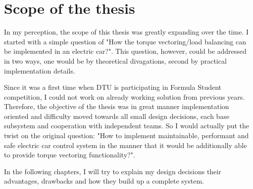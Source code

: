 






\section{Scope of the thesis}
In my perception, the scope of this thesis was greatly expanding over the time. I started with a simple question of "How the torque vectoring/load balancing can be implemented in an electric car?". This question, however, could be addressed in two ways, one would be by theoretical divagations, second by practical implementation details.

Since it was a first time when DTU is participating in Formula Student competition, I could not work on already working solution from previous years.
Therefore, the objective of the thesis was in great manner implementation oriented and difficulty moved towards all small design decisions, each base subsystem and cooperation with independent teams. So I would actually put the twist on the original question: "How to implement maintainable, performant and safe electric car control system in the manner that it would be additionally able to provide torque vectoring functionality?".

In the following chapters, I will try to explain my design decisions their advantages, drawbacks and how they build up a complete system.